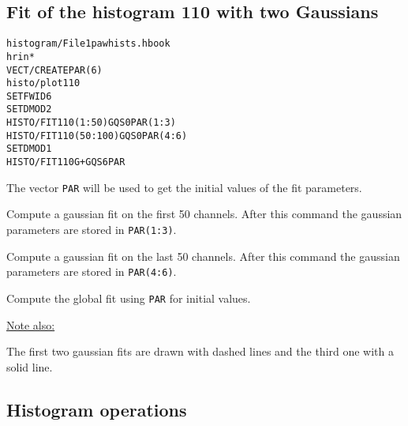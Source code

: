 \subsection*{Fit of the histogram 110 with two Gaussians}
\begin{alltt}
      histogram/File 1 pawhists.hbook
      hrin  *
     VECT/CREATE PAR(6)
      histo/plot 110
     SET FWID 6
     SET DMOD 2
     HISTO/FIT 110(1:50) G QS 0 PAR(1:3)
     HISTO/FIT 110(50:100) G QS 0 PAR(4:6)
     SET DMOD 1
     HISTO/FIT 110 G+G QS 6 PAR
\end{alltt} 
\begin{DinglistE}
\item The vector {\tt PAR} will be used to get the initial values
      of the fit parameters.
\item Compute a gaussian fit on the first 50 channels. After this command 
      the gaussian parameters are stored in {\tt PAR(1:3)}.
\item Compute a gaussian fit on the last 50 channels. After this command
      the gaussian parameters are stored in {\tt PAR(4:6)}.
\item Compute the global fit using {\tt PAR} for initial values. 

\underline{Note also:}

\item The first two gaussian fits are drawn with dashed lines and the third
      one with a solid line.
\end{DinglistE}

\clearpage

\subsection{Histogram operations}
